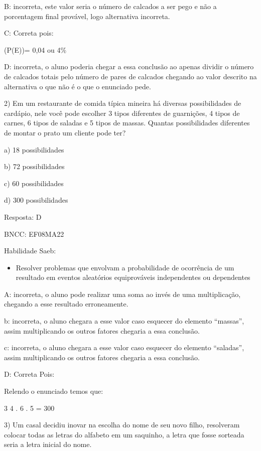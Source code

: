 B: incorreta, este valor seria o número de calcados a ser pego e não a
porcentagem final provável, logo alternativa incorreta.

C: Correta pois:

(P(E))= 0,04 ou 4\%

D: incorreta, o aluno poderia chegar a essa conclusão ao apenas dividir
o número de calcados totais pelo número de pares de calcados chegando ao
valor descrito na alternativa o que não é o que o enunciado pede.

2) Em um restaurante de comida típica mineira há diversas possibilidades
de cardápio, nele você pode escolher 3 tipos diferentes de guarnições, 4
tipos de carnes, 6 tipos de saladas e 5 tipos de massas. Quantas
possibilidades diferentes de montar o prato um cliente pode ter?

a) 18 possibilidades

b) 72 possibilidades

c) 60 possibilidades

d) 300 possibilidades

Resposta: D

BNCC: EF08MA22

Habilidade Saeb:

\begin{itemize}
\tightlist
\item
  Resolver problemas que envolvam a probabilidade de ocorrência de um
  resultado em eventos aleatórios equiprováveis independentes ou
  dependentes
\end{itemize}

A: incorreta, o aluno pode realizar uma soma ao invés de uma
multiplicação, chegando a esse resultado erroneamente.

b: incorreta, o aluno chegara a esse valor caso esquecer do elemento
``massas'', assim multiplicando os outros fatores chegaria a essa
conclusão.

c: incorreta, o aluno chegara a esse valor caso esquecer do elemento
``saladas'', assim multiplicando os outros fatores chegaria a essa
conclusão.

D: Correta Pois:

Relendo o enunciado temos que:

\num{3} 4 . 6 . 5 = 300

3) Um casal decidiu inovar na escolha do nome de seu novo filho,
resolveram colocar todas as letras do alfabeto em um saquinho, a letra
que fosse sorteada seria a letra inicial do nome.

